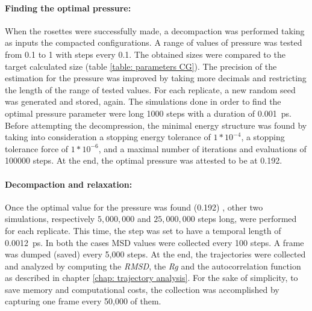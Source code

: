 \paragraph{Finding the optimal pressure:} \label{parag: optimal pressure}

When the rosettes were successfully made, a decompaction was performed taking as inputs the compacted configurations. A range of values of pressure was tested from 0.1 to 1 with steps every 0.1. The obtained sizes were compared to the target calculated size (table \ref{table: parameters CG}). The precision of the estimation for the pressure was improved by taking more decimals and restricting the length of the range of tested values. For each replicate, a new random seed was generated and stored, again. The simulations done in order to find the optimal pressure parameter were long 1000 steps with a duration of \SI{0.001}{\pico\second}.
Before attempting the decompression, the minimal energy structure was found by taking into consideration a stopping energy tolerance of $1*10^{-4}$, a stopping tolerance force of $1*10^{-6}$, and a maximal number of iterations and evaluations of 100000 steps. %
At the end, the optimal pressure was attested to be at 0.192. %





\paragraph{Decompaction and relaxation:}

Once the optimal value for the pressure was found (0.192) %
, other two simulations, respectively $5,000,000$ and $25,000,000$ steps long, were performed for each replicate. This time, the step was set to have a temporal length of \SI{0.0012}{\pico\second}. In both the cases MSD values were collected every 100 steps. A frame was dumped (saved) every 5,000 steps. At the end, the trajectories were collected and analyzed by computing the \textit{RMSD}, the \textit{Rg} and the autocorrelation function as described in chapter \ref{chap: trajectory analysis}. For the sake of simplicity, to save memory and computational costs, the collection was accomplished by capturing one frame every 50,000 of them.

